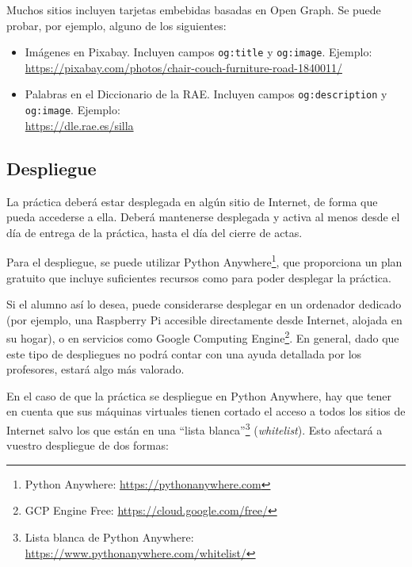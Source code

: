 Muchos sitios incluyen tarjetas embebidas basadas en Open Graph. Se puede probar, por ejemplo, alguno de los siguientes:

\begin{itemize}
\item Imágenes en Pixabay. Incluyen campos  \texttt{og:title} y \texttt{og:image}. Ejemplo: \\
  \url{https://pixabay.com/photos/chair-couch-furniture-road-1840011/}
\item Palabras en el Diccionario de la RAE. Incluyen campos  \texttt{og:description} y \texttt{og:image}. Ejemplo: \\
  \url{https://dle.rae.es/silla}
\end{itemize}

\subsection{Despliegue}
\label{sec:practica-2021-05:despliegue}

La práctica deberá estar desplegada en algún sitio de Internet, de forma que pueda accederse a ella. Deberá mantenerse desplegada y activa al menos desde el día de entrega de la práctica, hasta el día del cierre de actas.

Para el despliegue, se puede utilizar Python Anywhere\footnote{Python Anywhere: \url{https://pythonanywhere.com}}, que proporciona un plan gratuito que incluye suficientes recursos como para poder desplegar la práctica.

Si el alumno así lo desea, puede considerarse desplegar en un ordenador dedicado (por ejemplo, una Raspberry Pi accesible directamente desde Internet, alojada en su hogar), o en servicios como Google Computing Engine\footnote{GCP Engine Free: \url{https://cloud.google.com/free/}}. En general, dado que este tipo de despliegues no podrá contar con una ayuda detallada por los profesores, estará algo más valorado.

En el caso de que la práctica se despliegue en Python Anywhere, hay que tener en cuenta que sus máquinas virtuales tienen cortado el acceso a todos los sitios de Internet salvo los que están en una ``lista blanca''\footnote{Lista blanca de Python Anywhere: \url{https://www.pythonanywhere.com/whitelist/}} (\emph{whitelist}). Esto afectará a vuestro despliegue de dos formas:


